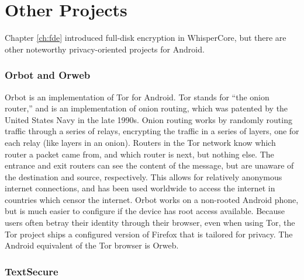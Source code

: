 \section{Other Projects}

Chapter \ref{ch:fde} introduced full-disk encryption in WhisperCore, but there are other noteworthy privacy-oriented projects for Android. 

\subsubsection{Orbot and Orweb}

Orbot is an implementation of Tor for Android. Tor stands for ``the onion router,'' and is an implementation of onion routing, which
was patented by the United States Navy in the late 1990s.  Onion routing works by randomly routing traffic through a series of
relays, encrypting the traffic in a series of layers, one for each relay (like layers in an onion). Routers in the Tor network know
which router a packet came from, and which router is next, but nothing else. The entrance and exit routers can see the content of
the message, but are unaware of the destination and source, respectively. This allows for relatively anonymous internet connections,
and has been used worldwide to access the internet in countries which censor the internet. Orbot works on a non-rooted Android
phone, but is much easier to configure if the device has root access available. Because users often betray their identity through
their browser, even when using Tor, the Tor project ships a configured version of Firefox that is tailored for privacy. The Android
equivalent of the Tor browser is Orweb.


\subsubsection{TextSecure}

